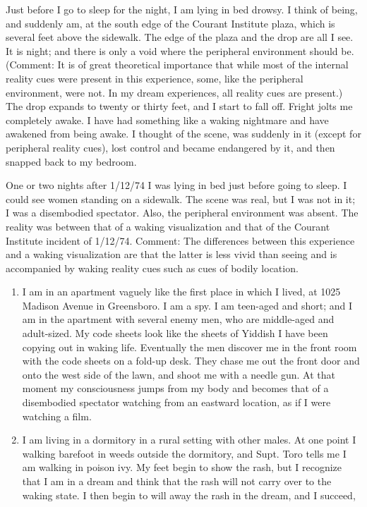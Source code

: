 \documentclass[10pt,twoside,draft]{memoir}
\begin{document}
{{Just before I go to sleep for the night, I am lying in bed drowsy. I think 
of being, and suddenly am, at the south edge of the Courant Institute plaza, 
which is several feet above the sidewalk. The edge of the plaza and the drop 
are all I see. It is night; and there is only a void where the peripheral 
environment should be. (Comment: It is of great theoretical importance that 
while most of the internal reality cues were present in this experience, some, 
like the peripheral environment, were not. In my dream experiences, all 
reality cues are present.) The drop expands to twenty or thirty feet, and I 
start to fall off. Fright jolts me completely awake. I have had something like 
a waking nightmare and have awakened from being awake. I thought of the 
scene, was suddenly in it (except for peripheral reality cues), lost control and 
became endangered by it, and then snapped back to my bedroom. 


One or two nights after 1/12/74 I was lying in bed just before going to 
sleep. I could see women standing on a sidewalk. The scene was real, but I 
was not in it; I was a disembodied spectator. Also, the peripheral 
environment was absent. The reality was between that of a waking 
visualization and that of the Courant Institute incident of 1/12/74. 
Comment: The differences between this experience and a waking 
visualization are that the latter is less vivid than seeing and is accompanied 
by waking reality cues such as cues of bodily location. 



\begin{enumerate}
\item I am in an apartment vaguely like the first place in which I lived, at 
1025 Madison Avenue in Greensboro. I am a spy. I am teen-aged and short; 
and I am in the apartment with several enemy men, who are middle-aged and 
adult-sized. My code sheets look like the sheets of Yiddish I have been 
copying out in waking life. Eventually the men discover me in the front 
room with the code sheets on a fold-up desk. They chase me out the front 
door and onto the west side of the lawn, and shoot me with a needle gun. At 
that moment my consciousness jumps from my body and becomes that of a 
disembodied spectator watching from an eastward location, as if I were 
watching a film. 

\item I am living in a dormitory in a rural setting with other males. At one 
point I walking barefoot in weeds outside the dormitory, and Supt. Toro 
tells me I am walking in poison ivy. My feet begin to show the rash, but I 
recognize that I am in a dream and think that the rash will not carry over to 
the waking state. I then begin to will away the rash in the dream, and I 
succeed, 
\end{enumerate}


}}
\end{document}
